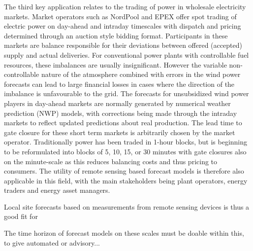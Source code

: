 The third key application relates to the trading of power in wholesale electricity markets. Market operators such as NordPool and EPEX offer spot trading of electric power on day-ahead and intraday timescales with dispatch and pricing determined through an auction style bidding format. Participants in these markets are balance responsible for their deviations between offered (accepted) supply and actual deliveries. For conventional power plants with controllable fuel resources, these imbalances are usually insignificant. However the variable non-controllable nature of the atmosphere combined with errors in the wind power forecasts can lead to large financial losses in cases where the direction of the imbalance is unfavourable to the grid. The forecasts for unsubsidized wind power players in day-ahead markets are normally generated by numerical weather prediction (NWP) models, with corrections being made through the intraday markets to reflect updated predictions about real production. The lead time to gate closure for these short term markets is arbitrarily chosen by the market operator. Traditionally power has been traded in 1-hour blocks, but is beginning to be reformulated into blocks of 5, 10, 15, or 30 minutes with gate closures also on the minute-scale as this reduces balancing costs and thus pricing to consumers. The utility of remote sensing based forecast models is therefore also applicable in this field, with the main stakeholders being plant operators, energy traders and energy asset managers.

Local site forecasts based on measurements from remote sensing devices is thus a good fit for 




The time horizon of forecast models on these scales must be doable within this, to give automated or advisory...


\begin{comment}

Limits of modelling

Apps:

Design criteria

Methods:
Measurement setup
WAFFLE
Balcony
LASCAR

Benchmark all

Challenges and opportunities

-----------------------------------------------------

due to drop in inertia, increae in stoasticity, etc.
ts modeling vs lidar
demonstrated methods and outlined applications of remote sensing for minute-scale forecasting.
\end{comment}

